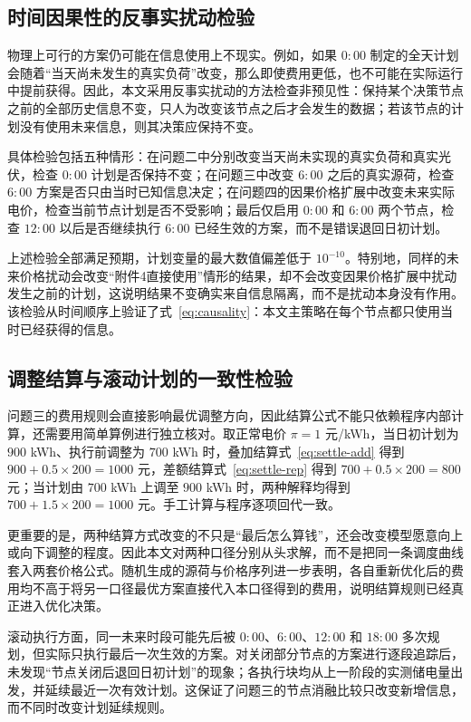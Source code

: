 \subsection{时间因果性的反事实扰动检验}

物理上可行的方案仍可能在信息使用上不现实。例如，如果 $0{:}00$ 制定的全天计划会随着“当天尚未发生的真实负荷”改变，那么即使费用更低，也不可能在实际运行中提前获得。因此，本文采用反事实扰动的方法检查非预见性：保持某个决策节点之前的全部历史信息不变，只人为改变该节点之后才会发生的数据；若该节点的计划没有使用未来信息，则其决策应保持不变。

具体检验包括五种情形：在问题二中分别改变当天尚未实现的真实负荷和真实光伏，检查 $0{:}00$ 计划是否保持不变；在问题三中改变 $6{:}00$ 之后的真实源荷，检查 $6{:}00$ 方案是否只由当时已知信息决定；在问题四的因果价格扩展中改变未来实际电价，检查当前节点计划是否不受影响；最后仅启用 $0{:}00$ 和 $6{:}00$ 两个节点，检查 $12{:}00$ 以后是否继续执行 $6{:}00$ 已经生效的方案，而不是错误退回日初计划。

上述检验全部满足预期，计划变量的最大数值偏差低于 $10^{-10}$。特别地，同样的未来价格扰动会改变“附件4直接使用”情形的结果，却不会改变因果价格扩展中扰动发生之前的计划，这说明结果不变确实来自信息隔离，而不是扰动本身没有作用。该检验从时间顺序上验证了式~\eqref{eq:causality}：本文主策略在每个节点都只使用当时已经获得的信息。

\subsection{调整结算与滚动计划的一致性检验}

问题三的费用规则会直接影响最优调整方向，因此结算公式不能只依赖程序内部计算，还需要用简单算例进行独立核对。取正常电价 $\pi=1$ 元/kWh，当日初计划为 $900$ kWh、执行前调整为 $700$ kWh 时，叠加结算式~\eqref{eq:settle-add} 得到 $900+0.5\times200=1000$ 元，差额结算式~\eqref{eq:settle-rep} 得到 $700+0.5\times200=800$ 元；当计划由 $700$ kWh 上调至 $900$ kWh 时，两种解释均得到 $700+1.5\times200=1000$ 元。手工计算与程序逐项回代一致。

更重要的是，两种结算方式改变的不只是“最后怎么算钱”，还会改变模型愿意向上或向下调整的程度。因此本文对两种口径分别从头求解，而不是把同一条调度曲线套入两套价格公式。随机生成的源荷与价格序列进一步表明，各自重新优化后的费用均不高于将另一口径最优方案直接代入本口径得到的费用，说明结算规则已经真正进入优化决策。

滚动执行方面，同一未来时段可能先后被 $0{:}00$、$6{:}00$、$12{:}00$ 和 $18{:}00$ 多次规划，但实际只执行最后一次生效的方案。对关闭部分节点的方案进行逐段追踪后，未发现“节点关闭后退回日初计划”的现象；各执行块均从上一阶段的实测储电量出发，并延续最近一次有效计划。这保证了问题三的节点消融比较只改变新增信息，而不同时改变计划延续规则。

